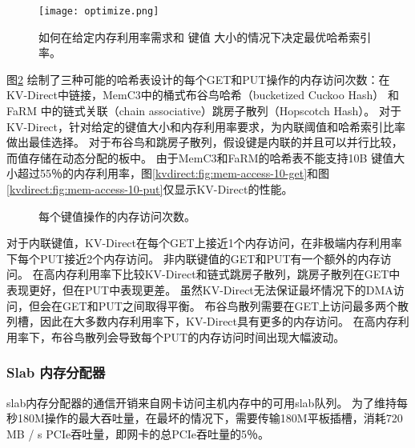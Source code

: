 \begin{figure}[t]
	\centering
	\texttt{[image: optimize.png]}
	\caption{如何在给定内存利用率需求和 键值 大小的情况下决定最优哈希索引率。}
	\label{kvdirect:fig:hashline-ratio}
\end{figure}

图\ref {kvdirect:fig:mem-access-tput} 绘制了三种可能的哈希表设计的每个GET和PUT操作的内存访问次数：在KV-Direct中链接，MemC3中的桶式布谷鸟哈希（bucketized Cuckoo Hash）\cite {fan2013memc3} 和FaRM \cite {dragojevic2014farm} 中的链式关联（chain associative）跳房子散列（Hopscotch Hash）。
对于KV-Direct，针对给定的键值大小和内存利用率要求，为内联阈值和哈希索引比率做出最佳选择。
对于布谷鸟和跳房子散列，假设键是内联的并且可以并行比较，而值存储在动态分配的板中。
由于MemC3和FaRM的哈希表不能支持10B 键值大小超过55％的内存利用率，图\ref {kvdirect:fig:mem-access-10-get}和图\ref {kvdirect:fig:mem-access-10-put}仅显示KV-Direct的性能。


\begin{figure}[t]
	\centering
	
	\vfill
	
	\caption{每个键值操作的内存访问次数。}
	\label{kvdirect:fig:mem-access-tput}
\end{figure}


对于内联键值，KV-Direct在每个GET上接近1个内存访问，在非极端内存利用率下每个PUT接近2个内存访问。
非内联键值的GET和PUT有一个额外的内存访问。
在高内存利用率下比较KV-Direct和链式跳房子散列，跳房子散列在GET中表现更好，但在PUT中表现更差。
虽然KV-Direct无法保证最坏情况下的DMA访问，但会在GET和PUT之间取得平衡。
布谷鸟散列需要在GET上访问最多两个散列槽，因此在大多数内存利用率下，KV-Direct具有更多的内存访问。
在高内存利用率下，布谷鸟散列会导致每个PUT的内存访问时间出现大幅波动。


\subsubsection{Slab 内存分配器}
\label{kvdirect:sec:slab-eval}

slab内存分配器的通信开销来自网卡访问主机内存中的可用slab队列。
为了维持每秒180M操作的最大吞吐量，在最坏的情况下，需要传输180M平板插槽，消耗720 MB / s PCIe吞吐量，即网卡的总PCIe吞吐量的5％。

